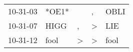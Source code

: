 \begin{supertabular}{lllll}
 10-31-03 &  *OE1* &               &             , &  OBLI \\
 10-31-07 &   HIGG &             , &  \textgreater &   LIE \\
 10-31-12 &   fool &  \textgreater &  \textgreater &  fool \\
\end{supertabular}
